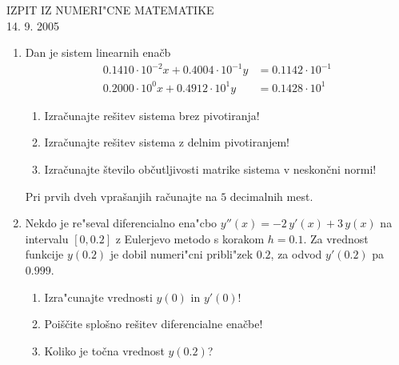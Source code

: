 

\begin{center}
  {\large IZPIT IZ NUMERI"CNE MATEMATIKE\\
    14. 9. 2005}
\end{center}
\vspace{1.5cm}
\begin{enumerate}
  \item Dan je sistem linearnih enačb
      \begin{eqnarray*}
	  0.1410\cdot 10^{-2}x+0.4004\cdot 10^{-1}y&=0.1142\cdot 10^{-1}\\
	  0.2000\cdot 10^0x+0.4912\cdot 10^1y&=0.1428\cdot 10^1
      \end{eqnarray*}
  \begin{enumerate}
      \item Izračunajte rešitev sistema brez pivotiranja!
      \item Izračunajte rešitev sistema z delnim pivotiranjem!
      \item Izračunajte število občutljivosti matrike sistema v neskončni normi! 
  \end{enumerate}
  Pri prvih dveh vprašanjih računajte na $5$ decimalnih mest.
  \item Nekdo je re"seval diferencialno ena"cbo $y''(x)=-2\,y'(x)+3\,y(x)$ 
    na intervalu $[0,0.2]$ z Eulerjevo metodo s korakom $h=0.1$.
    Za vrednost funkcije $y(0.2)$ je dobil numeri"cni pribli"zek $0.2$,
    za odvod $y'(0.2)$ pa $0.999$. 
    \begin{enumerate}    
	\item Iz\-ra\-"cu\-najte vrednosti  $y(0)$ in $y'(0)$! 
	\item Poiščite splošno rešitev diferencialne enačbe!
	\item Koliko je točna vrednost $y(0.2)$? 
    \end{enumerate}
    \end{enumerate}

